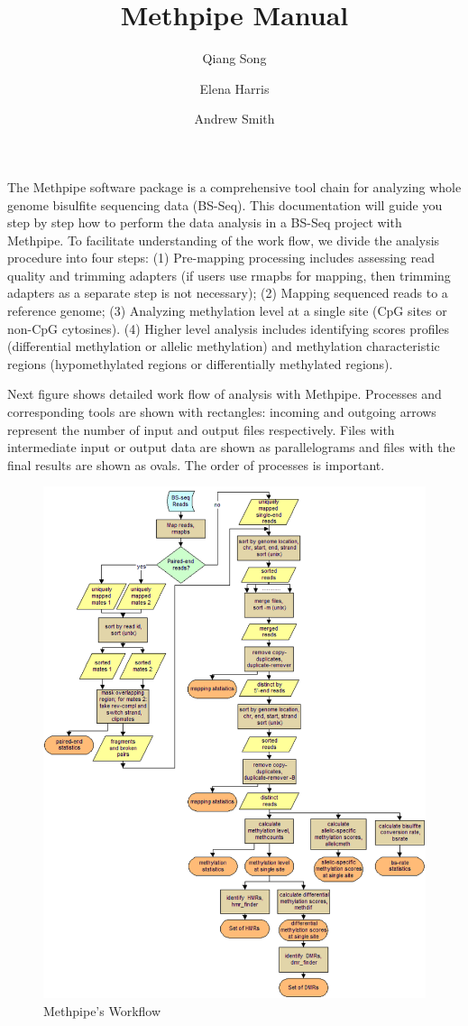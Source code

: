 \documentclass{article}
\title{Methpipe Manual}
\author{Qiang Song \and Elena Harris \and Andrew Smith}
\begin{document}
\maketitle
The Methpipe software package is a comprehensive tool chain for
analyzing whole genome bisulfite sequencing data (BS-Seq).  This
documentation will guide you step by step how to perform the
data analysis in a BS-Seq project with Methpipe. To facilitate
understanding of the work flow, we divide the analysis procedure into
four steps: (1) Pre-mapping processing includes assessing
read quality and  trimming adapters (if users use rmapbs for mapping, then 
trimming adapters as a separate step is not necessary); (2)
Mapping sequenced reads to a reference genome; (3)
Analyzing methylation level at a single site (CpG sites or
non-CpG cytosines). (4) Higher level analysis includes
identifying scores profiles (differential methylation or allelic methylation) 
and methylation characteristic regions (hypomethylated regions or 
differentially methylated regions). 

Next figure  shows detailed work flow of analysis with Methpipe.
Processes and corresponding tools are shown with rectangles: incoming and outgoing 
arrows represent the number of input and output files respectively.
Files with intermediate input or output data are shown as parallelograms
and files with the final results are shown as ovals.
The order of processes is important.
\begin{figure}[htbp]
  \centering
  \includegraphics[width=6.3in]{figs/Methpipe_work_flow.pdf}
  \caption{Methpipe's Workflow}
  \label{fig:workflow}
\end{figure}
 
\end{document}
